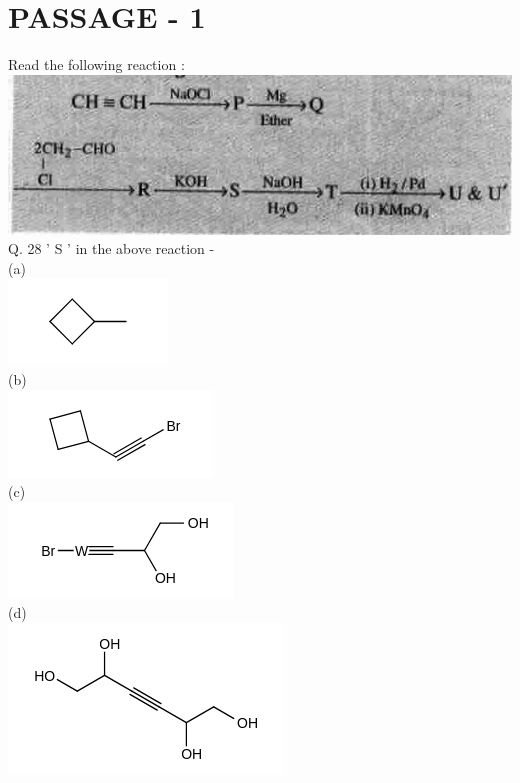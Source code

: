 \documentclass[10pt]{article}
\begin{document}
\section*{PASSAGE - 1}
Read the following reaction :\\
\includegraphics[max width=\textwidth, center]{2025_01_28_8470952b98110cec3aabg-236(2)}\\
Q. 28 ' S ' in the above reaction -\\
(a)\\
\includegraphics{smile-36c78c963949aa012ecf5e2cbd3e8eefe641dec2}\\
(b)\\
\includegraphics{smile-9e52e50ce4b47dafd40332a3b1058a5a2d4342f6}\\
(c)\\
\includegraphics{smile-8278ea93f7566778969a107ab3ef7911dd4c1381}\\
(d)\\
\includegraphics{smile-403c5ca1dab0f68908cf051faef4ca3222245e42}\\
\end{document}
